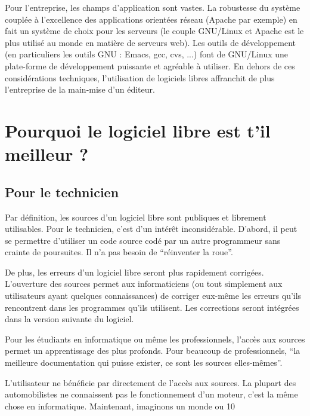 \documentclass{article}
\begin{document}
Pour l'entreprise, les champs d'application sont vastes. La robustesse du système couplée à l'excellence des applications orientées réseau (Apache par exemple) en fait un système de choix pour les serveurs (le couple GNU/Linux et Apache est le plus utilisé au monde en matière de serveurs web). Les outils de développement (en particuliers les outils GNU : Emacs, gcc, cvs, ...) font de GNU/Linux une plate-forme de développement puissante et agréable à utiliser. En dehors de ces considérations techniques, l'utilisation de logiciels libres affranchit de plus l'entreprise de la main-mise d'un éditeur.
\section{Pourquoi le logiciel libre est t'il meilleur ?}
\subsection{Pour le technicien}

Par définition, les sources d'un logiciel libre sont publiques et librement utilisables. Pour le technicien, c'est d'un intérêt inconsidérable. D'abord, il peut se permettre d'utiliser un code source codé par un autre programmeur sans crainte de poursuites. Il n'a pas besoin de ``réinventer la roue''.

De plus, les erreurs d'un logiciel libre seront plus rapidement corrigées. L'ouverture des sources permet aux informaticiens (ou tout simplement aux utilisateurs ayant quelques connaissances) de corriger eux-même les erreurs qu'ils rencontrent dans les programmes qu'ils utilisent. Les corrections seront intégrées dans la version suivante du logiciel.

Pour les étudiants en informatique ou même les professionnels, l'accès aux sources permet un apprentissage des plus profonds. Pour beaucoup de professionnels, ``la meilleure documentation qui puisse exister, ce sont les sources elles-mêmes''.

L'utilisateur ne bénéficie par directement de l'accès aux sources. La plupart des automobilistes ne connaissent pas le fonctionnement d'un moteur, c'est la même chose en informatique. Maintenant, imaginons un monde ou 10%
\end{document}
